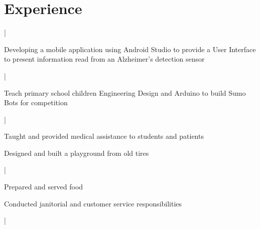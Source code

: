 \documentclass{resume}
\begin{document}

\section{Experience}

\vspace{1.2mm}
 |  \hfill{}
\begin{tightemize} \item Developing a mobile application using \textcolor{body-text-emphasis}{Android Studio} to provide a \textcolor{body-text-emphasis}{User Interface} to present information read from an Alzheimer's detection sensor
\end{tightemize}

 |  \hfill{}
\begin{tightemize} \item Teach primary school children \textcolor{body-text-emphasis}{Engineering Design} and \textcolor{body-text-emphasis}{Arduino} to build Sumo Bots for competition
\end{tightemize}

 |  \hfill{}
\begin{tightemize} \item Taught and provided medical assistance to students and patients \item Designed and built a playground from old tires
\end{tightemize}

 |  \hfill{}
\begin{tightemize} \item Prepared and served food \item Conducted janitorial and customer service responsibilities
\end{tightemize}

 |  \hfill{}
\begin{tightemize}
\end{tightemize}
\end{document}
